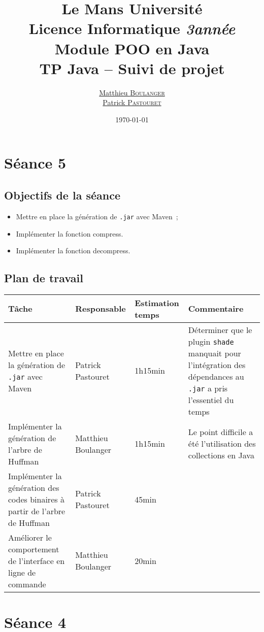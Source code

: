 \documentclass[a4paper,11pt]{article}
\title {\textbf {\color {blue} Le Mans Université}\color{black}
\\  Licence Informatique  \textit {3\ieme année}
 \\Module POO en Java
 \\ \textbf {TP Java – Suivi de projet}}
\author{\href{mailto: matthieu.boulanger.etu@univ-lemans.fr} {Matthieu \textsc{Boulanger}}\\
      \href{mailto: patrick.pastouret.etu@univ-lemans.fr} {Patrick \textsc{Pastouret}}}
\date{\today}
\begin{document}
\maketitle

\section{Séance 5}

\subsection{Objectifs de la séance}
\begin{itemize}
    \item Mettre en place la génération de \texttt{.jar} avec Maven~;
    \item Implémenter la fonction compress.
    \item Implémenter la fonction decompress.
\end{itemize}

\subsection{Plan de travail}
\begin{center}
    \begin{tabular}{p{.3\linewidth}p{.3\linewidth}p{.3\linewidth}p{.3\linewidth}}
      \toprule
	Tâche & Responsable & Estimation temps & Commentaire \\
      \midrule
      Mettre en place la génération de \texttt{.jar} avec Maven & 
      Patrick Pastouret & 
      1h15min & 
      Déterminer que le plugin \texttt{shade} manquait pour l’intégration des dépendances au \texttt{.jar} a pris l’essentiel du temps \\
      Implémenter la génération de l’arbre de Huffman &
      Matthieu Boulanger &
      1h15min &
      Le point difficile a été l’utilisation des collections en Java \\
      Implémenter la génération des codes binaires à partir de l’arbre de Huffman &
      Patrick Pastouret &
      45min &
      \\
      Améliorer le comportement de l’interface en ligne de commande & 
      Matthieu Boulanger & 
      20min & 
      \\
      \bottomrule
   \end{tabular}
\end{center}

\section{Séance 4}
\end{document}
